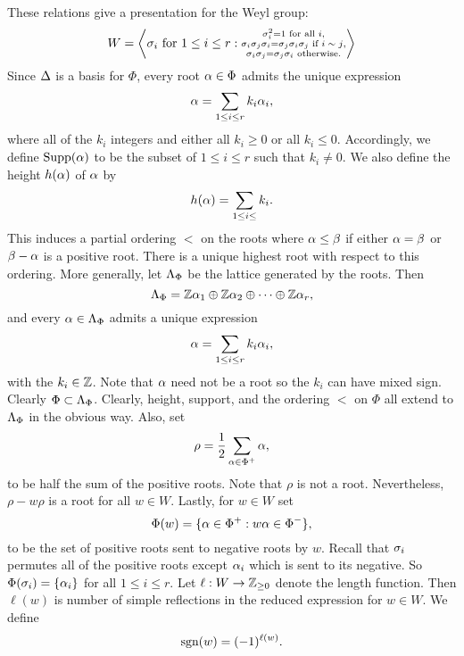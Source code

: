 \documentclass[12pt,reqno,oneside]{amsart}
\begin{document}
        These relations give a presentation for the Weyl group:
        \[
            W = \left\langle \sigma_{i} \text{ for } 1 \le i \le r: \substack{\sigma_{i}^{2} = 1 \text{ for all $i$}, \\ \sigma_{i}\sigma_{j}\sigma_{i} = \sigma_{j}\sigma_{i}\sigma_{j} \text{ if $i \sim j$}, \\ \sigma_{i}\sigma_{j} = \sigma_{j}\sigma_{i} \text{ otherwise}.} \right\rangle
        \]
        Since $\Delta$ is a basis for $\Phi$, every root $\alpha \in \Phi$ admits the unique expression
        \[
            \alpha = \sum_{1 \le i \le r}k_{i}\alpha_{i},
        \]
        where all of the $k_{i}$ integers and either all $k_{i} \ge 0$ or all $k_{i} \le 0$. Accordingly, we define $\operatorname{\mathrm{Supp}}(\alpha)$ to be the subset of $1 \le i \le r$ such that $k_{i} \neq 0$. We also define the height $h(\alpha)$ of $\alpha$ by
        \[
            h(\alpha) = \sum_{1 \le i \le }k_{i}.
        \]
        This induces a partial ordering $<$ on the roots where $\alpha \le \beta$ if either $\alpha = \beta$ or $\beta-\alpha$ is a positive root. There is a unique highest root with respect to this ordering. More generally, let $\Lambda_{\Phi}$ be the lattice generated by the roots. Then
        \[
            \Lambda_{\Phi} = \mathbb{Z}\alpha_{1} \oplus \mathbb{Z}\alpha_{2} \oplus \cdots \oplus \mathbb{Z}\alpha_{r},
        \]
        and every $\alpha \in \Lambda_{\Phi}$ admits a unique expression
        \[
            \alpha = \sum_{1 \le i \le r}k_{i}\alpha_{i},
        \]
        with the $k_{i} \in \mathbb{Z}$. Note that $\alpha$ need not be a root so the $k_{i}$ can have mixed sign. Clearly $\Phi \subset \Lambda_{\Phi}$. Clearly, height, support, and the ordering $<$ on $\Phi$ all extend to $\Lambda_{\Phi}$ in the obvious way. Also, set
        \[
            \rho = \frac{1}{2}\sum_{\alpha \in \Phi^{+}}\alpha,
        \]
        to be half the sum of the positive roots. Note that $\rho$ is not a root. Nevertheless, $\rho-w\rho$ is a root for all $w \in W$. Lastly, for $w \in W$ set
        \[
            \Phi(w) = \{\alpha \in \Phi^{+}:w\alpha \in \Phi^{-}\},
        \]
        to be the set of positive roots sent to negative roots by $w$. Recall that $\sigma_{i}$ permutes all of the positive roots except $\alpha_{i}$ which is sent to its negative. So $\Phi(\sigma_{i}) = \{\alpha_{i}\}$ for all $1 \le i \le r$. Let $\ell:W \to \mathbb{Z}_{\ge 0}$ denote the length function. Then $\ell(w)$ is number of simple reflections in the reduced expression for $w \in W$. We define
        \[
            \operatorname{\mathrm{sgn}}(w) = (-1)^{\ell(w)}.
        \]
\end{document}
